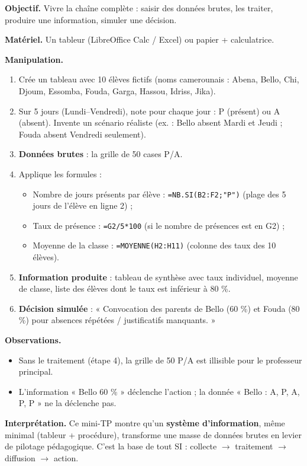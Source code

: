 \documentclass[11pt]{article}
\begin{document}
\begin{experience}
\textbf{Objectif.} Vivre la chaîne complète : saisir des données brutes, les traiter, produire une information, simuler une décision.

\textbf{Matériel.} Un tableur (LibreOffice Calc / Excel) ou papier + calculatrice.

\textbf{Manipulation.}
\begin{enumerate}
    \item Crée un tableau avec 10 élèves fictifs (noms camerounais : Abena, Bello, Chi, Djoum, Essomba, Fouda, Garga, Hassou, Idriss, Jika).
    \item Sur 5 jours (Lundi–Vendredi), note pour chaque jour : P (présent) ou A (absent). Invente un scénario réaliste (ex. : Bello absent Mardi et Jeudi ; Fouda absent Vendredi seulement).
    \item \textbf{Données brutes} : la grille de 50 cases P/A.
    \item Applique les formules :
    \begin{itemize}
        \item Nombre de jours présents par élève : \texttt{=NB.SI(B2:F2;"P")} (plage des 5 jours de l'élève en ligne 2) ;
        \item Taux de présence : \texttt{=G2/5*100} (si le nombre de présences est en G2) ;
        \item Moyenne de la classe : \texttt{=MOYENNE(H2:H11)} (colonne des taux des 10 élèves).
    \end{itemize}
    \item \textbf{Information produite} : tableau de synthèse avec taux individuel, moyenne de classe, liste des élèves dont le taux est inférieur à 80 \%.
    \item \textbf{Décision simulée} : « Convocation des parents de Bello (60 \%) et Fouda (80 \%) pour absences répétées / justificatifs manquants. »
\end{enumerate}

\textbf{Observations.}
\begin{itemize}
    \item Sans le traitement (étape 4), la grille de 50 P/A est illisible pour le professeur principal.
    \item L'information « Bello 60 \% » déclenche l'action ; la donnée « Bello : A, P, A, P, P » ne la déclenche pas.
\end{itemize}

\textbf{Interprétation.}
Ce mini-TP montre qu'un \textbf{système d'information}, même minimal (tableur + procédure), transforme une masse de données brutes en levier de pilotage pédagogique. C'est la base de tout SI : collecte $\to$ traitement $\to$ diffusion $\to$ action.
\end{experience}
\end{document}
